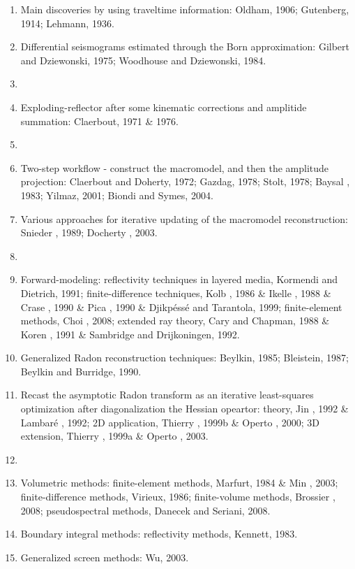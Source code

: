 \begin{enumerate}[\hspace{10mm}*]
  \item Main discoveries by using traveltime information:
    Oldham, 1906; Gutenberg, 1914; Lehmann, 1936.
  \item Differential seismograms estimated through the Born approximation:
    Gilbert and Dziewonski, 1975; Woodhouse and Dziewonski, 1984.
  \item \sline
  \item Exploding-reflector after some kinematic corrections and
    amplitide summation: Claerbout, 1971 \& 1976.
  \item \sline
  \item Two-step workflow - construct the macromodel, and then
    the amplitude projection: Claerbout and Doherty, 1972; Gazdag, 1978;
    Stolt, 1978; Baysal \etal, 1983; Yilmaz, 2001; Biondi and Symes, 2004.
  \item Various approaches for iterative updating of
    the macromodel reconstruction: Snieder \etal, 1989; Docherty \etal, 2003.
  \item \sline
  \item Forward-modeling: reflectivity techniques in layered media,
    Kormendi and Dietrich, 1991; finite-difference techniques,
    Kolb \etal, 1986 \& Ikelle \etal, 1988 \& Crase \etal, 1990 \&
    Pica \etal, 1990 \& Djikp\'ess\'e and Tarantola, 1999;
    finite-element methods, Choi \etal, 2008; extended ray theory,
    Cary and Chapman, 1988 \& Koren \etal, 1991 \&
    Sambridge and Drijkoningen, 1992.
  \item Generalized Radon reconstruction techniques: Beylkin, 1985;
    Bleistein, 1987; Beylkin and Burridge, 1990.
  \item Recast the asymptotic Radon transform as an iterative least-squares
    optimization after diagonalization the Hessian opeartor:
    theory, Jin \etal, 1992 \& Lambar\'e \etal, 1992;
    2D application, Thierry \etal, 1999b \& Operto \etal, 2000;
    3D extension, Thierry \etal, 1999a \& Operto \etal, 2003.
  \item \sline
  \item Volumetric methods: finite-element methods, Marfurt, 1984 \&
    Min \etal, 2003; finite-difference methods, Virieux, 1986;
    finite-volume methods, Brossier \etal, 2008;
    pseudospectral methods, Danecek and Seriani, 2008.
  \item Boundary integral methods: reflectivity methods, Kennett, 1983.
  \item Generalized screen methods: Wu, 2003.

\end{enumerate}
